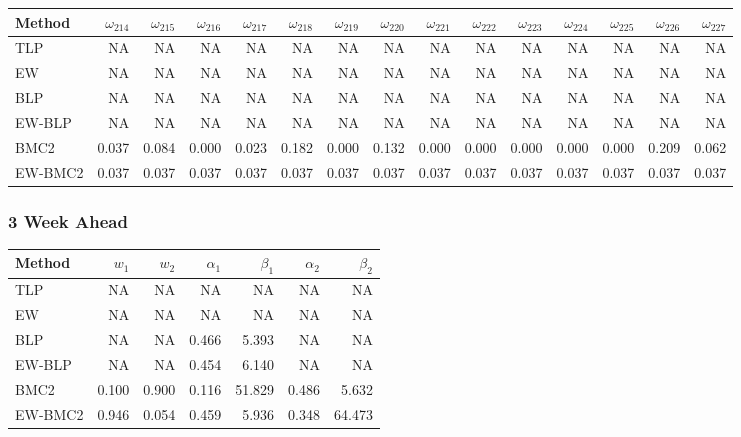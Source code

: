 \documentclass[
]{article}
\begin{document}
\begin{tabular}{lrrrrrrrrrrrrrr}
\toprule
Method & $\omega_{214}$ & $\omega_{215}$ & $\omega_{216}$ & $\omega_{217}$ & $\omega_{218}$ & $\omega_{219}$ & $\omega_{220}$ & $\omega_{221}$ & $\omega_{222}$ & $\omega_{223}$ & $\omega_{224}$ & $\omega_{225}$ & $\omega_{226}$ & $\omega_{227}$\\
\midrule
TLP & NA & NA & NA & NA & NA & NA & NA & NA & NA & NA & NA & NA & NA & NA\\
EW & NA & NA & NA & NA & NA & NA & NA & NA & NA & NA & NA & NA & NA & NA\\
BLP & NA & NA & NA & NA & NA & NA & NA & NA & NA & NA & NA & NA & NA & NA\\
EW-BLP & NA & NA & NA & NA & NA & NA & NA & NA & NA & NA & NA & NA & NA & NA\\
BMC2 & 0.037 & 0.084 & 0.000 & 0.023 & 0.182 & 0.000 & 0.132 & 0.000 & 0.000 & 0.000 & 0.000 & 0.000 & 0.209 & 0.062\\
EW-BMC2 & 0.037 & 0.037 & 0.037 & 0.037 & 0.037 & 0.037 & 0.037 & 0.037 & 0.037 & 0.037 & 0.037 & 0.037 & 0.037 & 0.037\\
\bottomrule
\end{tabular}

\hypertarget{week-ahead-14}{%
\subsubsection{3 Week Ahead}\label{week-ahead-14}}

\begin{tabular}{lrrrrrr}
\toprule
Method & $w_1$ & $w_2$ & $\alpha_1$ & $\beta_1$ & $\alpha_2$ & $\beta_2$\\
\midrule
TLP & NA & NA & NA & NA & NA & NA\\
EW & NA & NA & NA & NA & NA & NA\\
BLP & NA & NA & 0.466 & 5.393 & NA & NA\\
EW-BLP & NA & NA & 0.454 & 6.140 & NA & NA\\
BMC2 & 0.100 & 0.900 & 0.116 & 51.829 & 0.486 & 5.632\\
EW-BMC2 & 0.946 & 0.054 & 0.459 & 5.936 & 0.348 & 64.473\\
\bottomrule
\end{tabular}
\end{document}
